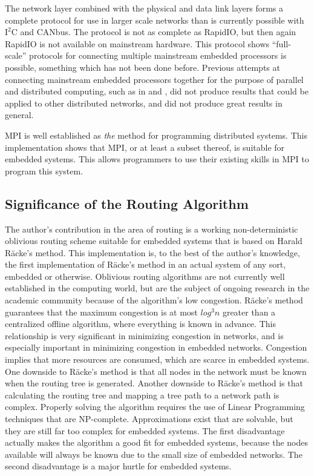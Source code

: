 The network layer combined with the physical and data link layers forms a complete protocol for use in larger scale networks than is currently possible with $\textrm{I}^2\textrm{C} $ and CANbus. The protocol is not as complete as RapidIO, but then again RapidIO is not available on mainstream hardware. This protocol shows ``full-scale'' protocols for connecting multiple mainstream embedded processors is possible, something which has not been done before. Previous attempts at connecting mainstream embedded processors together for the purpose of parallel and distributed computing, such as in \cite{ref:2007-szekacs-multiprocessor_spi_system} and \cite{ref:2007-raman-h.264_parallel_transcoder}, did not produce results that could be applied to other distributed networks, and did not produce great results in general.

MPI is well established as \emph{the} method for programming distributed systems. This implementation shows that MPI, or at least a subset thereof, is suitable for embedded systems. This allows programmers to use their existing skills in MPI to program this system.

\subsection{Significance of the Routing Algorithm}\label{sec:conclusions:conclusions:significance:routing}

The author's contribution in the area of routing is a working non-deterministic oblivious routing scheme suitable for embedded systems that is based on Harald R\"acke's method. This implementation is, to the best of the author's knowledge, the first implementation of R\"acke's method in an actual system of any sort, embedded or otherwise. Oblivious routing algorithms are not currently well established in the computing world, but are the subject of ongoing research in the academic community because of the algorithm's low congestion. R\"acke's method guarantees that the maximum congestion is at most $log^3 n $ greater than a centralized offline algorithm, where everything is known in advance. \cite{ref:2003-racke-oblivious_routing} This relationship is very significant in minimizing congestion in networks, and is especially important in minimizing congestion in embedded networks. Congestion implies that more resources are consumed, which are scarce in embedded systems. One downside to R\"acke's method is that all nodes in the network must be known when the routing tree is generated. Another downside to R\"acke's method is that calculating the routing tree and mapping a tree path to a network path is complex. Properly solving the algorithm requires the use of Linear Programming techniques that are NP-complete. Approximations exist that are solvable, but they are still far too complex for embedded systems. The first disadvantage actually makes the algorithm a good fit for embedded systems, because the nodes available will always be known due to the small size of embedded networks. The second disadvantage is a major hurtle for embedded systems.

